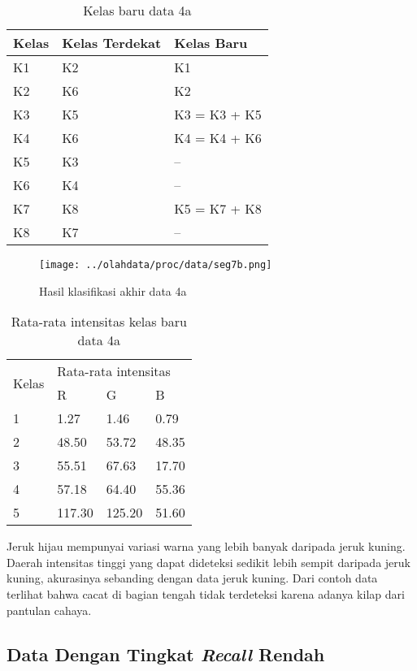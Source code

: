 \documentclass[laporan.tex]{subfiles}
\begin{document}
\begin{table}[h!]
\centering
\begin{tabular}{|l|l|l|}
\hline
Kelas & Kelas Terdekat & Kelas Baru \\
\hline
K1 & K2 & K1 \\
K2 & K6 & K2 \\
K3 & K5 & K3 = K3 + K5 \\
K4 & K6 & K4 = K4 + K6 \\
K5 & K3 & -- \\
K6 & K4 & -- \\
K7 & K8 & K5 = K7 + K8 \\
K8 & K7 & -- \\
\hline
\end{tabular}
\caption{Kelas baru data 4a}
\label{table:clsgreen2}
\end{table}

\begin{figure}[h!]
\centering
\texttt{[image: ../olahdata/proc/data/seg7b.png]}
\caption{Hasil klasifikasi akhir data 4a}
\end{figure}

\begin{table}[h!]
\centering
\begin{tabular}{|l|l|l|l|}
\cline{1-4}
\multirow{2}{*}{Kelas} & \multicolumn{3}{l|}{Rata-rata intensitas} \\
\cline{2-4}
 & R & G & B \\
\cline{1-4}
1 & 1.27 & 1.46 & 0.79 \\
2 & 48.50 & 53.72 & 48.35 \\
3 & 55.51 & 67.63 & 17.70 \\
4 & 57.18 & 64.40 & 55.36 \\
5 & 117.30 & 125.20 & 51.60 \\
\cline{1-4}
\end{tabular}
\caption{Rata-rata intensitas kelas baru data 4a}
\label{table:avggreen2}
\end{table}

Jeruk hijau mempunyai variasi warna yang lebih banyak daripada jeruk kuning. Daerah intensitas tinggi yang dapat dideteksi sedikit lebih sempit daripada jeruk kuning, akurasinya sebanding dengan data jeruk kuning. Dari contoh data terlihat bahwa cacat di bagian tengah tidak terdeteksi karena adanya kilap dari pantulan cahaya.

\subsection{Data Dengan Tingkat \emph{Recall} Rendah}
\end{document}
